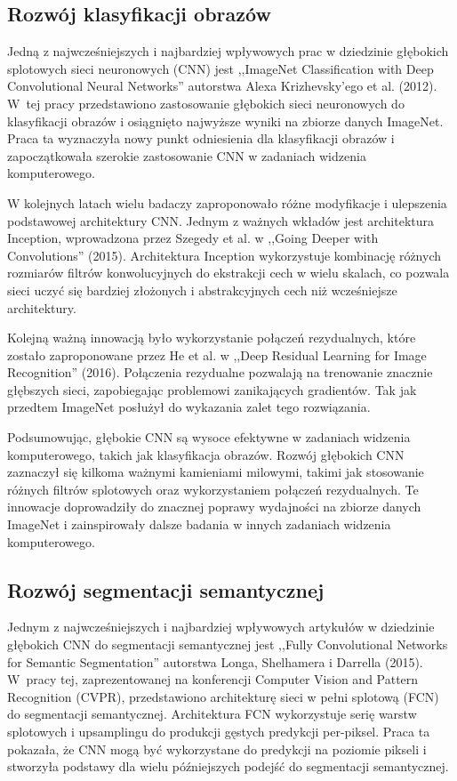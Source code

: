 \subsection{Rozwój klasyfikacji obrazów}
Jedną z najwcześniejszych i najbardziej wpływowych prac w dziedzinie głębokich splotowych sieci neuronowych (CNN) jest ,,ImageNet Classification with Deep Convolutional Neural Networks'' autorstwa Alexa Krizhevsky'ego et al. (2012)\cite{krizhevsky2017imagenet}. W~tej pracy przedstawiono zastosowanie głębokich sieci neuronowych do klasyfikacji obrazów i osiągnięto najwyższe wyniki na zbiorze danych ImageNet. Praca ta wyznaczyła nowy punkt odniesienia dla klasyfikacji obrazów i zapoczątkowała szerokie zastosowanie CNN w zadaniach widzenia komputerowego.

W kolejnych latach wielu badaczy zaproponowało różne modyfikacje i ulepszenia podstawowej architektury CNN. Jednym z ważnych wkładów jest architektura Inception, wprowadzona przez Szegedy et al. w ,,Going Deeper with Convolutions'' (2015)\cite{szegedy2015going}. Architektura Inception wykorzystuje kombinację różnych rozmiarów filtrów konwolucyjnych do ekstrakcji cech w wielu skalach, co pozwala sieci uczyć się bardziej złożonych i abstrakcyjnych cech niż wcześniejsze architektury.

Kolejną ważną innowacją było wykorzystanie połączeń rezydualnych, które zostało zaproponowane przez He et al. w ,,Deep Residual Learning for Image Recognition'' (2016)\cite{he2016deep}. Połączenia rezydualne pozwalają na trenowanie znacznie głębszych sieci, zapobiegając problemowi zanikających gradientów. Tak jak przedtem ImageNet posłużył do wykazania zalet tego rozwiązania.

Podsumowując, głębokie CNN są wysoce efektywne w zadaniach widzenia komputerowego, takich jak klasyfikacja obrazów. Rozwój głębokich CNN zaznaczył się kilkoma ważnymi kamieniami milowymi, takimi jak stosowanie różnych filtrów splotowych oraz wykorzystaniem połączeń rezydualnych. Te innowacje doprowadziły do znacznej poprawy wydajności na zbiorze danych ImageNet i zainspirowały dalsze badania w innych zadaniach widzenia komputerowego.
\subsection{Rozwój segmentacji semantycznej}
Jednym z najwcześniejszych i najbardziej wpływowych artykułów w dziedzinie głębokich CNN do segmentacji semantycznej jest ,,Fully Convolutional Networks for Semantic Segmentation'' autorstwa Longa, Shelhamera i Darrella (2015)\cite{fcn}. W~pracy tej, zaprezentowanej na konferencji Computer Vision and Pattern Recognition (CVPR), przedstawiono architekturę sieci w pełni splotową (FCN) do segmentacji semantycznej. Architektura FCN wykorzystuje serię warstw splotowych i upsamplingu do produkcji gęstych predykcji per-piksel. Praca ta pokazała, że CNN mogą być wykorzystane do predykcji na poziomie pikseli i stworzyła podstawy dla wielu późniejszych podejść do segmentacji semantycznej.

